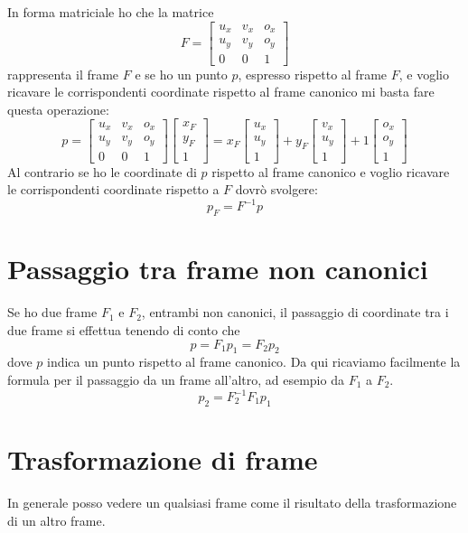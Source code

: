 In forma matriciale ho che la matrice
\[
	F = \begin{bmatrix}
		u_x & v_x & o_x \\
		u_y & v_y & o_y \\
		0   & 0   & 1
	\end{bmatrix}
\]
rappresenta il frame $F$ e se ho un punto $p$, espresso rispetto al frame $F$, e voglio
ricavare le corrispondenti coordinate rispetto al frame canonico mi basta fare questa
operazione:
\[
	p = \begin{bmatrix}
		u_x & v_x & o_x \\
		u_y & v_y & o_y \\
		0   & 0   & 1
	\end{bmatrix}
	\begin{bmatrix}
		x_F \\ y_F \\ 1
	\end{bmatrix} =
	x_F \begin{bmatrix}
		u_x \\ u_y \\ 1
	\end{bmatrix} +
	y_F \begin{bmatrix}
		v_x \\ u_y \\ 1
	\end{bmatrix} +
	1 \begin{bmatrix}
		o_x \\ o_y \\ 1
	\end{bmatrix}
\]
Al contrario se ho le coordinate di $p$ rispetto al frame canonico e voglio ricavare le
corrispondenti coordinate rispetto a $F$ dovr\`o svolgere:
\[ p_F = F^{-1} p \]

\section{Passaggio tra frame non canonici}
Se ho due frame $F_1$ e $F_2$, entrambi non canonici, il passaggio di coordinate tra i due frame
si effettua tenendo di conto che
\[ p = F_1 p_1 = F_2 p_2 \]
dove $p$ indica un punto rispetto al frame canonico. Da qui ricaviamo facilmente la formula
per il passaggio da un frame all'altro, ad esempio da $F_1$ a $F_2$.
\[ p_2 = F_2^{-1} F_1 p_1 \]

\section{Trasformazione di frame}
In generale posso vedere un qualsiasi frame come il risultato della trasformazione di un altro
frame.

